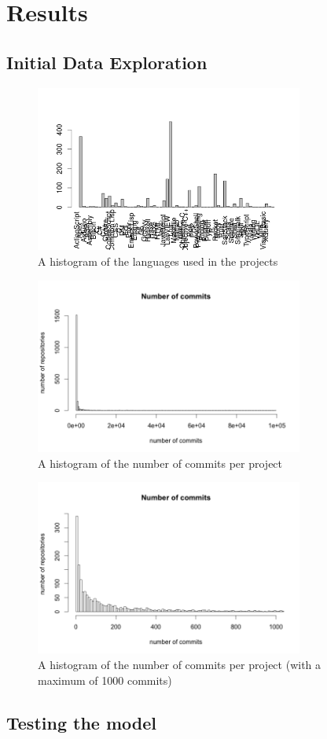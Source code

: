 \section{Results}
    \subsection{Initial Data Exploration}
	    \begin{figure}
	        \includegraphics[width=250pt]{figures/language-frequency}
	        \caption{A histogram of the languages used in the projects}
	        \label{fig:language-frequency-plot}
	    \end{figure}
	    \begin{figure}
	        \includegraphics[width=250pt]{figures/number-of-commits-all}
	        \caption{A histogram of the number of commits per project}
	        \label{fig:number-of-commits-all-plot}
	    \end{figure}
	    \begin{figure}
	        \includegraphics[width=250pt]{figures/number-of-commits-1000}
	        \caption{A histogram of the number of commits per project (with a maximum of 1000 commits)}
	        \label{fig:number-of-commits-1000-plot}
	    \end{figure}
    
    \subsection{Testing the model}
